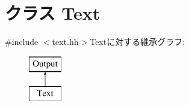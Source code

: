 \hypertarget{classStats_1_1Text}{
\section{クラス Text}
\label{classStats_1_1Text}
}


{\ttfamily \#include $<$text.hh$>$}Textに対する継承グラフ:\begin{figure}[H]
\begin{center}
\leavevmode
\includegraphics[height=2cm]{classStats_1_1Text}
\end{center}
\end{figure}
